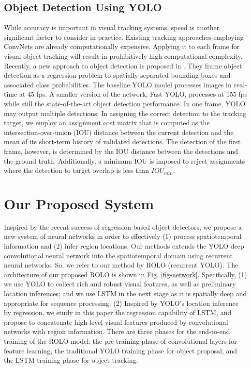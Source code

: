 \documentclass{article}
\begin{document}
\subsection{Object Detection Using YOLO}

While accuracy is important in visual tracking systems, speed is another significant factor to consider in practice. Existing tracking approaches employing ConvNets are already computationally expensive. Applying it to each frame for visual object tracking will
result in prohibitively high computational complexity.
Recently, a new approach to object detection is proposed in \citep{redmon2015you}. They frame object detection as a regression problem to spatially separated bounding boxes and associated class probabilities. The baseline YOLO model processes images in real-time at 45 fps. A smaller version of the network, Fast YOLO, processes at 155 fps while still the state-of-the-art object detection performance.
In one frame, YOLO may output multiple detections. In assigning the correct detection to the tracking target, we employ an assignment cost matrix that is computed as the intersection-over-union (IOU) distance between the current detection and the mean of its short-term history of validated detections. The detection of the first frame, however, is determined by the IOU distance between the detections and the ground truth. Additionally, a minimum IOU is imposed to reject assignments where the detection to target overlap is less than $IOU_{min}$.

\section{Our Proposed System} \label{proposed-system}


Inspired by the recent success of regression-based object detectors, we propose a new system of neural networks in order to effectively (1) process spatiotemporal information and (2) infer region locations.
Our methods extends the YOLO deep convolutional neural network into the spatiotemporal domain using recurrent neural networks.
So, we refer to our method by ROLO (recurrent YOLO).
The architecture of our proposed  ROLO is shown in Fig. \ref{fig-network}. Specifically,
(1) we use YOLO to collect rich and robust visual features, as well as preliminary location inferences; and we use LSTM in the next stage as it is spatially deep and appropriate for sequence processing.
(2) Inspired by YOLO’s location inference by regression, we study in this paper the regression capability of LSTM, and propose to concatenate high-level visual features produced by convolutional networks with region information.
There are three phases for the end-to-end training of the ROLO model: the pre-training phase of convolutional layers for feature learning, the traditional YOLO training phase for object proposal, and the LSTM training phase for object tracking.
\end{document}
